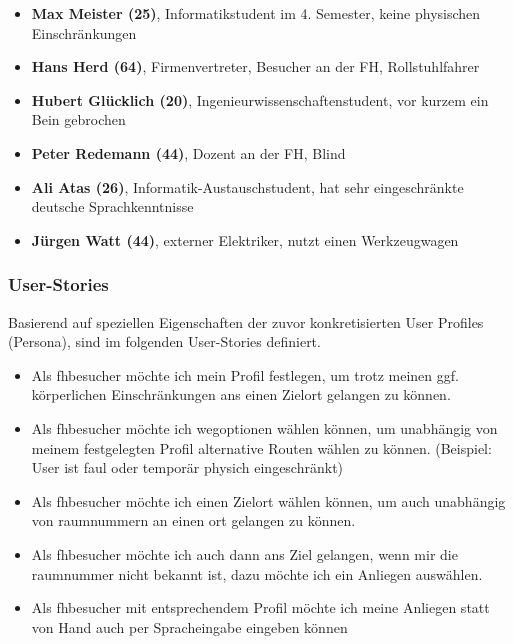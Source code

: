 \begin{itemize}
  \item \textbf{Max Meister (25)}, Informatikstudent im 4. Semester, keine physischen Einschränkungen
  \item \textbf{Hans Herd (64)}, Firmenvertreter, Besucher an der FH, Rollstuhlfahrer
  \item \textbf{Hubert Glücklich (20)}, Ingenieurwissenschaftenstudent, vor kurzem ein Bein gebrochen
  \item \textbf{Peter Redemann (44)}, Dozent an der FH, Blind
  \item \textbf{Ali Atas (26)}, Informatik-Austauschstudent, hat sehr eingeschränkte deutsche Sprachkenntnisse
  \item \textbf{Jürgen Watt (44)}, externer Elektriker, nutzt einen Werkzeugwagen 
\end{itemize}

\subsubsection*{User-Stories}
Basierend auf speziellen Eigenschaften der zuvor konkretisierten User Profiles (Persona), sind im folgenden User-Stories definiert.
\begin{itemize}
\item Als \gls{fhbesucher} möchte ich mein Profil festlegen, um trotz meinen ggf. körperlichen Einschränkungen ans einen Zielort gelangen zu können.
\item Als \gls{fhbesucher} möchte ich \gls{weg}optionen wählen können, um unabhängig von meinem festgelegten Profil alternative Routen wählen zu können. (Beispiel: User ist faul oder temporär physich eingeschränkt)
\item Als \gls{fhbesucher} möchte ich einen Zielort wählen können, um auch unabhängig von \gls{raum}nummern an einen \gls{ort} gelangen zu können.
\item Als \gls{fhbesucher} möchte ich auch dann ans Ziel gelangen, wenn mir die \gls{raum}nummer nicht bekannt ist, dazu möchte ich ein Anliegen auswählen.
\item Als \gls{fhbesucher} mit entsprechendem Profil möchte ich meine Anliegen statt von Hand auch per Spracheingabe eingeben können
\end{itemize}

